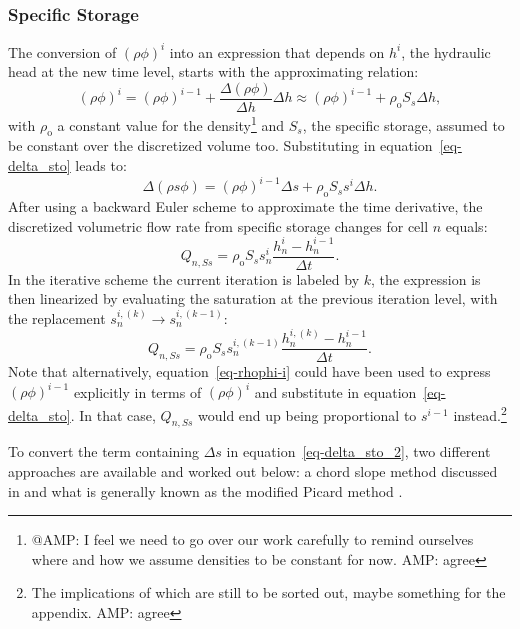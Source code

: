 \documentclass[fleqn]{article}
\begin{document}
\subsubsection*{Specific Storage}
The conversion of $(\rho\phi)^i$ into an expression that depends
on $h^i$, the hydraulic head at the new time level, starts with 
the approximating relation:
\begin{equation}
  (\rho\phi)^i =
  (\rho\phi)^{i-1} + \frac{\Delta (\rho\phi)}{\Delta h} \Delta h \approx
  (\rho\phi)^{i-1} + \rho_\textrm{o} S_s \Delta h,
  \label{eq-rhophi-i}
\end{equation}
with $\rho_{\textrm{o}}$ a constant value for the density\footnote{@AMP:
  I feel we need to go over our work carefully to remind ourselves
  where and how we assume densities to be constant for now. AMP: agree}
and $S_s$, the specific storage, assumed to be constant over
the discretized volume too. Substituting in equation~\ref{eq-delta_sto}
leads to:
\begin{equation}
  \Delta \left ( \rho s \phi \right ) =
  (\rho \phi)^{i-1}\Delta s +
  \rho_{\textrm{o}} S_s s^i \Delta h.
  \label{eq-delta_sto_2}
\end{equation}
After using a backward Euler scheme to approximate the time
derivative, the discretized volumetric flow rate from specific
storage changes for cell $n$ equals:
\begin{equation}
  Q_{n,Ss} = \rho_{\textrm{o}} S_s s_n^i
  \frac{h_n^i - h_n^{i-1}}{\Delta t}.
\end{equation}
In the iterative scheme the current iteration is labeled
by $k$, the expression is then linearized by evaluating
the saturation at the previous iteration level, with the
replacement $s_n^{i,(k)} \rightarrow s_n^{i,(k-1)}$:
\begin{equation}
  Q_{n,Ss} = \rho_{\textrm{o}} S_s s_n^{i,(k-1)} 
  \frac{h_n^{i,(k)} - h_n^{i-1}}{\Delta t}.
  \label{eq-delta_sto_ss_iter}
\end{equation}
Note that alternatively, equation~\ref{eq-rhophi-i} could have
been used to express $(\rho\phi)^{i-1}$ explicitly in terms 
of $(\rho\phi)^i$ and substitute in equation~\ref{eq-delta_sto}. 
In that case, $Q_{n,Ss}$ would end up being proportional to 
$s^{i-1}$ instead.\footnote{The implications of which are still
  to be sorted out, maybe something for the appendix. AMP: agree}

To convert the term containing $\Delta s$ in 
equation~\ref{eq-delta_sto_2}, two different 
approaches are available and worked out below: 
a chord slope method discussed in \cite{rathfelder-1994}
and what is generally known as the modified Picard method
\cite{celia-1990}.
\end{document}

